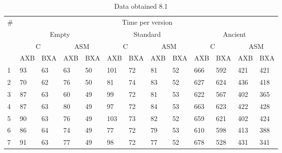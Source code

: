 \documentclass[legalpaper,12pt]{article}
\begin{document}
\begin{table}[htbp]
\caption*{Data obtained 8.1}
\begin{tabular}{|l|l|l|l|l|l|l|l|l|l|l|l|l|}
\hline
\multicolumn{1}{|c|}{\multirow{4}{*}{\#}} & \multicolumn{12}{c|}{Time per version}          \\ \cline{2-13} 
\multicolumn{1}{|c|}{}                    & \multicolumn{4}{c|}{Empty}                       & \multicolumn{4}{c|}{Standard}                    & \multicolumn{4}{c|}{Ancient}                        \\ \cline{2-13} 
\multicolumn{1}{|c|}{}                    & \multicolumn{2}{c|}{C} & \multicolumn{2}{c|}{ASM} & \multicolumn{2}{c|}{C} & \multicolumn{2}{c|}{ASM} & \multicolumn{2}{c|}{C} & \multicolumn{2}{c|}{ASM} \\ \cline{2-13} 
\multicolumn{1}{|c|}{}                    & AXB        & BXA       & AXB         & BXA        & AXB        & BXA       & AXB         & BXA        & AXB        & BXA       & AXB         & BXA        \\ \hline
1                                         & 93         & 63        & 63          & 50         & 101        & 72        & 81          & 52         & 666        & 592       & 421         & 421        \\ \hline
2                                         & 70         & 62        & 76          & 50         & 81         & 74        & 83          & 52         & 627        & 624       & 436         & 418        \\ \hline
3                                         & 87         & 63        & 60          & 49         & 99         & 72        & 81          & 53         & 622        & 567       & 402         & 365        \\ \hline
4                                         & 87         & 63        & 80          & 49         & 97         & 72        & 84          & 53         & 663        & 623       & 422         & 428        \\ \hline
5                                         & 90         & 63        & 76          & 49         & 103        & 73        & 82          & 52         & 659        & 621       & 402         & 424        \\ \hline
6                                         & 86         & 64        & 74          & 49         & 77         & 72        & 79          & 53         & 610        & 598       & 413         & 388        \\ \hline
7                                         & 91         & 63        & 77          & 49         & 98         & 72        & 77          & 52         & 678        & 528       & 431         & 341        \\ \hline

\end{tabular}
\end{table}
\end{document}
